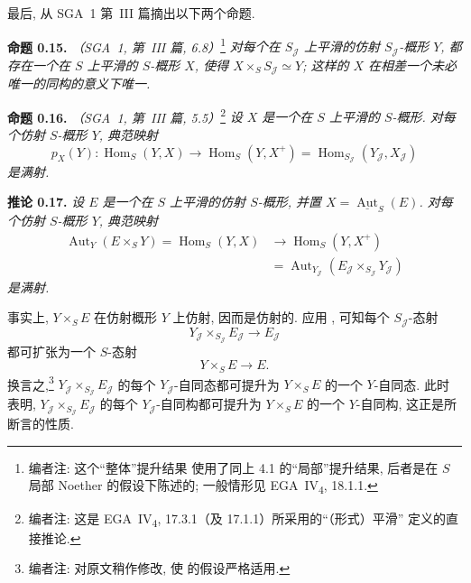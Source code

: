 最后, 从 SGA~1 第~III 篇摘出以下两个命题.

\medskip
\noindent{}\textbf{命题 0.15.}
\textit{（SGA~1, 第~III 篇, 6.8）}\footnote{编者注: 这个“整体”提升结果
使用了同上 4.1 的“局部”提升结果, 后者是在 \(S\) 局部 Noether 的假设下陈述的;
一般情形见 EGA~IV\textsubscript{4}, 18.1.1.}
\textit{对每个在 \(S_{\mathscr J}\) 上平滑的仿射
\(S_{\mathscr J}\)-概形 \(Y\), 都存在一个在 \(S\) 上平滑的
\(S\)-概形 \(X\), 使得 \(X\times_S S_{\mathscr J}\simeq Y\);
这样的 \(X\) 在相差一个未必唯一的同构的意义下唯一.}

\medskip
\noindent{}\textbf{命题 0.16.}
\textit{（SGA~1, 第~III 篇, 5.5）}\footnote{编者注: 这是
EGA~IV\textsubscript{4}, 17.3.1（及 17.1.1）所采用的“（形式）平滑”
定义的直接推论.}
\textit{设 \(X\) 是一个在 \(S\) 上平滑的 \(S\)-概形.
对每个仿射 \(S\)-概形 \(Y\), 典范映射}
\[
 p_X(Y):\operatorname{Hom}_S(Y,X)
 \longrightarrow\operatorname{Hom}_S(Y,X^+)
 =\operatorname{Hom}_{S_{\mathscr J}}(Y_{\mathscr J},X_{\mathscr J})
\]
\textit{是满射.}

\medskip
\noindent{}\textbf{推论 0.17.}
\textit{设 \(E\) 是一个在 \(S\) 上平滑的仿射 \(S\)-概形,
并置 \(X=\underline{\operatorname{Aut}}_S(E)\).
对每个仿射 \(S\)-概形 \(Y\), 典范映射}
\begin{align*}
 \operatorname{Aut}_Y(E\times_S Y)
  =\operatorname{Hom}_S(Y,X)
 &\longrightarrow \operatorname{Hom}_S(Y,X^+)\\
  &=\operatorname{Aut}_{Y_{\mathscr J}}
    (E_{\mathscr J}\times_{S_{\mathscr J}}Y_{\mathscr J})
\end{align*}
\textit{是满射.}

事实上, \(Y\times_S E\) 在仿射概形 \(Y\) 上仿射,
因而是仿射的. 应用 ,
可知每个 \(S_{\mathscr J}\)-态射
\[
 Y_{\mathscr J}\times_{S_{\mathscr J}}E_{\mathscr J}
 \longrightarrow E_{\mathscr J}
\]
都可扩张为一个 \(S\)-态射
\[
 Y\times_S E\longrightarrow E.
\]
换言之,\footnote{编者注: 对原文稍作修改, 使
 的假设严格适用.}
\(Y_{\mathscr J}\times_{S_{\mathscr J}}E_{\mathscr J}\) 的每个
\(Y_{\mathscr J}\)-自同态都可提升为 \(Y\times_S E\) 的一个
\(Y\)-自同态. 此时 ~
表明, \(Y_{\mathscr J}\times_{S_{\mathscr J}}E_{\mathscr J}\) 的每个
\(Y_{\mathscr J}\)-自同构都可提升为 \(Y\times_S E\) 的一个
\(Y\)-自同构, 这正是所断言的性质.

